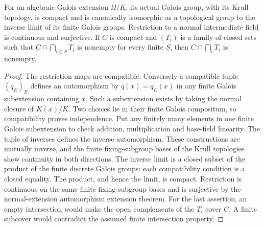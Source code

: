 \begin{lemma}
\label{fw:profinite-galois-foundations}
\mathlibok
For an algebraic Galois extension $\Omega/K$, its actual Galois group,
with its Krull topology, is compact and is canonically isomorphic as a
topological group to the inverse limit of its finite Galois groups.
Restriction to a normal intermediate field is continuous and surjective.
If $C$ is compact and $(T_i)$ is a family of closed sets such that
$C\cap\bigcap_{i\in S}T_i$ is nonempty for every finite $S$, then
$C\cap\bigcap_iT_i$ is nonempty.
\end{lemma}
\begin{proof}
The restriction maps are compatible. Conversely a compatible tuple
$(q_E)_E$ defines an automorphism by $q(x)=q_E(x)$ in any finite Galois
subextension containing $x$. Such a subextension exists by taking the
normal closure of $K(x)/K$. Two choices lie in their finite Galois
compositum, so compatibility proves independence. Put any finitely many
elements in one finite Galois subextension to check addition,
multiplication and base-field linearity. The tuple of inverses defines
the inverse automorphism. These constructions are mutually inverse,
and the finite fixing-subgroup bases of the Krull topologies show
continuity in both directions. The inverse limit is a closed subset
of the product of the finite discrete Galois groups: each compatibility
condition is a closed equality. The product, and hence the limit, is
compact. Restriction is continuous on the same finite fixing-subgroup
bases and is surjective by the normal-extension automorphism extension
theorem. For the last assertion, an empty intersection would make the
open complements of the $T_i$ cover $C$. A finite subcover would
contradict the assumed finite intersection property.
\end{proof}

